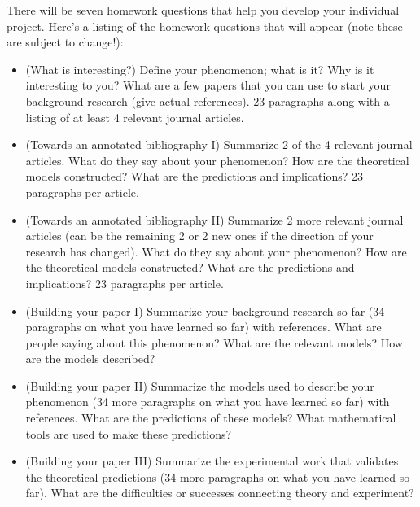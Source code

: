 \documentclass[letterpaper,10pt,english]{jupyterBook}
\begin{document}
\sphinxAtStartPar
There will be seven homework questions that help you develop your individual project.  Here’s a  listing of the homework questions that will appear (note these are subject to change!):
\begin{itemize}
\item {} 
\sphinxAtStartPar
{} (What is interesting?) \sphinxhyphen{} Define your phenomenon; what is it? Why is it interesting to you? What are a few papers that you can use to start your background research (give actual references). 2\sphinxhyphen{}3 paragraphs along with a listing of at least 4 relevant journal articles.

\item {} 
\sphinxAtStartPar
{} (Towards an annotated bibliography I) \sphinxhyphen{} Summarize 2 of the 4 relevant journal articles. What do they say about your phenomenon? How are the theoretical models constructed? What are the predictions and implications? 2\sphinxhyphen{}3 paragraphs per article.

\item {} 
\sphinxAtStartPar
{} (Towards an annotated bibliography II)\sphinxhyphen{} Summarize 2 more relevant journal articles (can be the remaining 2 or 2 new ones if the direction of your research has changed). What do they say about your phenomenon? How are the theoretical models constructed? What are the predictions and implications? 2\sphinxhyphen{}3 paragraphs per article.

\item {} 
\sphinxAtStartPar
{} (Building your paper I) \sphinxhyphen{} Summarize your background research so far (3\sphinxhyphen{}4 paragraphs on what you have learned so far) with references. What are people saying about this phenomenon? What are the relevant models? How are the models described?

\item {} 
\sphinxAtStartPar
{} (Building your paper II) \sphinxhyphen{} Summarize the models used to describe your phenomenon (3\sphinxhyphen{}4 more paragraphs on what you have learned so far) with references. What are the predictions of these models? What mathematical tools are used to make these predictions?

\item {} 
\sphinxAtStartPar
{} (Building your paper III) \sphinxhyphen{} Summarize the experimental work that validates the theoretical predictions (3\sphinxhyphen{}4 more paragraphs on what you have learned so far). What are the difficulties or successes connecting theory and experiment?


\end{itemize}
\end{document}
